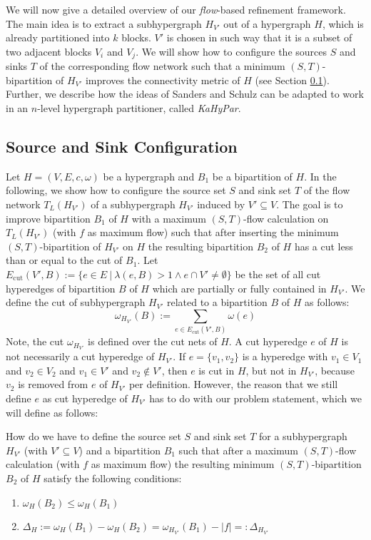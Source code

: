 We will now give a detailed overview of our \emph{flow}-based refinement framework. The main
idea is to extract a subhypergraph $H_{V'}$ out of a hypergraph $H$, which is already
partitioned into $k$ blocks. $V'$ is chosen in such way that it is a subset of two
adjacent blocks $V_i$ and $V_j$. We will show how to configure
the sources $S$ and sinks $T$ of the corresponding flow network such that
a minimum $(S,T)$-bipartition of $H_{V'}$ improves the connectivity metric of $H$
(see Section \ref{sec:source_and_sink}). Further, we describe how the ideas of
Sanders and Schulz \cite{sanders2011engineering} 
can be adapted to work in an $n$-level hypergraph partitioner, called \emph{KaHyPar}. 

\subsection{Source and Sink Configuration}
\label{sec:source_and_sink}

Let $H = (V,E,c,\omega)$ be a hypergraph and $B_1$ be a bipartition of $H$.
In the following, we show how to configure the source set $S$ and sink set $T$ of the flow
network $T_L(H_{V'})$ of a subhypergraph $H_{V'}$ induced by $V' \subseteq V$. The goal is 
to improve bipartition $B_1$ of $H$ with a maximum $(S,T)$-flow calculation 
on $T_L(H_{V'})$ (with $f$ as maximum flow) such that after inserting the minimum 
$(S,T)$-bipartition of $H_{V'}$ on $H$ the resulting bipartition $B_2$ of $H$ has a 
cut less than or equal to the cut of $B_1$.
Let $E_{\text{cut}}(V',B) := \{ e \in E\ |\ \lambda(e,B) > 1 \land e \cap V' \neq \emptyset\}$ 
be the set of all cut hyperedges of bipartition $B$ of $H$ which are partially or fully contained in $H_{V'}$.
We define the cut of subhypergraph $H_{V'}$ related to a bipartition $B$ of $H$
as follows:
\[\omega_{H_{V'}}(B) := \sum_{e \in E_{\text{cut}}(V',B)} \omega(e) \]
Note, the cut $\omega_{H_{V'}}$ is defined over the
cut nets of $H$. A cut hyperedge $e$ of $H$ is not necessarily a cut hyperedge
of $H_{V'}$. If $e = \{v_1,v_2\}$ is a hyperedge with $v_1 \in V_1$ and $v_2 \in V_2$ and
$v_1 \in V'$ and $v_2 \notin V'$, then $e$ is cut in $H$, but not in $H_{V'}$, because
$v_2$ is removed from $e$ of $H_{V'}$ per definition. However, the reason that we still
define $e$ as cut hyperedge of $H_{V'}$ has to do with our problem statement, 
which we will define as follows:

\begin{problem}
\label{prob:ST} 
How do we have to define the source set $S$ and sink set $T$ for a subhypergraph $H_{V'}$ 
(with $V' \subseteq V$) and a bipartition $B_1$ such that 
after a maximum $(S,T)$-flow calculation (with $f$ as maximum flow)
the resulting minimum $(S,T)$-bipartition $B_2$ of $H$ satisfy the following conditions:
\begin{enumerate}
\item $\omega_H(B_2) \le \omega_H(B_1)$
\item $\Delta_{H} := \omega_H(B_1) - \omega_H(B_2) = \omega_{H_{V'}}(B_1) - |f| =: \Delta_{H_{V'}}$
\end{enumerate}
\end{problem}

